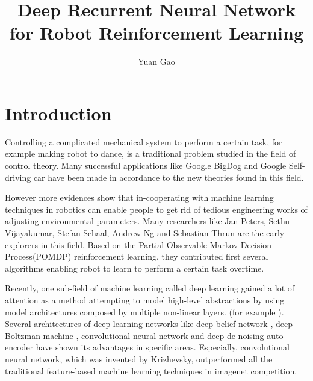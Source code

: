 \documentclass[officiallayout]{tktla}
\title{Deep Recurrent Neural Network for Robot Reinforcement Learning \\}
\author{Yuan Gao}
\begin{document}
\frontmatter

\maketitle
\listoftodos
\begin{abstract}

\end{abstract}

\begin{acknowledgements}

\end{acknowledgements}

\tableofcontents

\mainmatter
\chapter{Introduction}

Controlling a complicated mechanical system to perform a certain task, for example making robot to dance, is a traditional problem studied in the field of control theory. Many successful applications like Google BigDog\cite{Raibert2008} and Google Self-driving car \cite{Guizzo2011a} have been made in accordance to the new theories found in this field.

However more evidences show that in-cooperating with machine learning techniques in robotics can enable people to get rid of tedious engineering works of adjusting environmental parameters. Many researchers like Jan Peters, Sethu Vijayakumar, Stefan Schaal, Andrew Ng and Sebastian Thrun are the early explorers in this field. Based on the Partial Observable Markov Decision Process(POMDP) reinforcement learning, they contributed first several algorithms enabling robot to learn to perform a certain task overtime.

Recently, one sub-field of machine learning called deep learning gained a lot of attention as a method attempting to model high-level abstractions by using model architectures composed by multiple non-linear layers. (for example \cite{Krizhevsky2012}). Several architectures of deep learning networks like deep belief network \cite{Hinton2006}, deep Boltzman machine \cite{Salakhutdinov2009}, convolutional neural network \cite{Krizhevsky2012} and deep de-noising auto-encoder \cite{Vincent2010} have shown its advantages in specific areas. Especially, convolutional neural network, which was invented by Krizhevsky, outperformed all the traditional feature-based machine learning techniques in imagenet competition.
\end{document}
